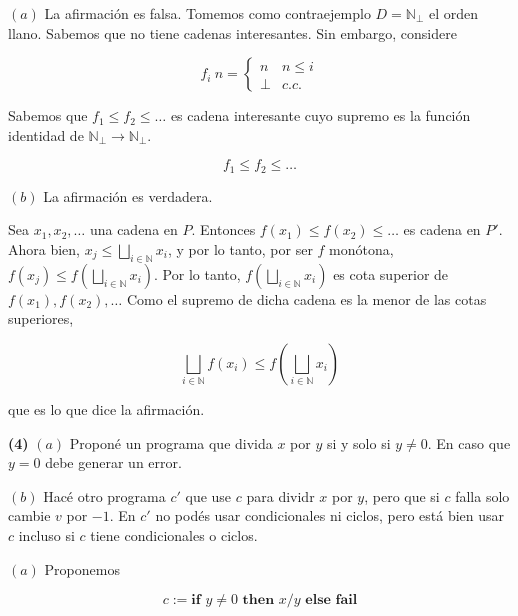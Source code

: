 \documentclass[a4paper, 12pt]{article}
\begin{document}
$(a)$ La afirmación es falsa. Tomemos como contraejemplo $D =
\mathbb{N}_\bot $ el orden llano. Sabemos que no tiene cadenas interesantes. Sin
embargo, considere 

\begin{equation*}
  f_i ~ n = \begin{cases}
    n & n \leq i \\ 
    \bot &c.c.
  \end{cases}
\end{equation*}

Sabemos que $f_1 \leq f_2 \leq \ldots$ es cadena interesante cuyo supremo es la
función identidad de $\mathbb{N}_\bot \to \mathbb{N}_\bot $.

\begin{equation*}
  f_1 \leq f_2 \leq \ldots
\end{equation*}

$(b)$ La afirmación es verdadera. 

Sea $x_1, x_2, \ldots$ una cadena en $P$.
Entonces $f(x_1) \leq f(x_2) \leq \ldots$ es cadena en $P'$. Ahora bien, 
$x_j \leq \bigsqcup_{i \in \mathbb{N}} x_i$, y por lo tanto, por ser $f$
monótona, $f(x_j) \leq f(\bigsqcup_{i \in \mathbb{N}} x_i)$. Por lo tanto, $f\left(
\bigsqcup_{i \in \mathbb{N}} x_i\right) $ es cota superior de $f(x_1), f(x_2),
\ldots$ Como el supremo de dicha cadena es la menor de las cotas superiores, 

\begin{equation*}
  \bigsqcup_{i \in \mathbb{N}} f(x_i) \leq f\left( \bigsqcup_{i \in \mathbb{N}}
  x_i\right) 
\end{equation*}

que es lo que dice la afirmación.

\pagebreak 

\begin{myframe}
  \textbf{(4)} $(a)$ Proponé un programa que divida $x$ por $y$ si y solo si $y \neq
  0$. En caso que $y = 0$ debe generar un error.  

  $(b)$ Hacé otro programa $c'$ que use $c$ para dividr $x$ por $y$, pero que si
  $c$ falla solo cambie $v$ por $-1$. En $c'$ no podés usar condicionales ni
  ciclos, pero está bien usar $c$ incluso si $c$ tiene condicionales o ciclos.
\end{myframe}

$(a)$ Proponemos 

\begin{equation*}
  c := \textbf{if } y \neq 0 \textbf{ then } x / y \textbf{ else } \textbf{fail}
\end{equation*}
\end{document}
